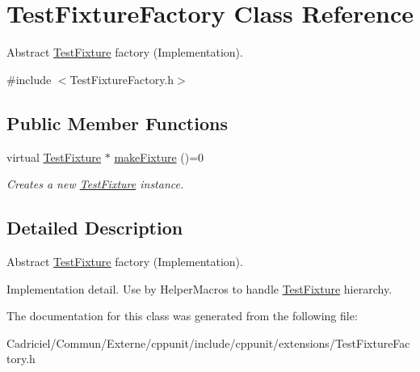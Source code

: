 \hypertarget{class_test_fixture_factory}{\section{Test\-Fixture\-Factory Class Reference}
\label{class_test_fixture_factory}
}


Abstract \hyperlink{class_test_fixture}{Test\-Fixture} factory (Implementation).  




{\ttfamily \#include $<$Test\-Fixture\-Factory.\-h$>$}

\subsection*{Public Member Functions}
\begin{DoxyCompactItemize}
\item 
\hypertarget{class_test_fixture_factory_a50ae33b88d818ef819478e47929a820c}{virtual \hyperlink{class_test_fixture}{Test\-Fixture} $\ast$ \hyperlink{class_test_fixture_factory_a50ae33b88d818ef819478e47929a820c}{make\-Fixture} ()=0}\label{class_test_fixture_factory_a50ae33b88d818ef819478e47929a820c}

\begin{DoxyCompactList}\small\item\em Creates a new \hyperlink{class_test_fixture}{Test\-Fixture} instance. \end{DoxyCompactList}\end{DoxyCompactItemize}


\subsection{Detailed Description}
Abstract \hyperlink{class_test_fixture}{Test\-Fixture} factory (Implementation). 

Implementation detail. Use by Helper\-Macros to handle \hyperlink{class_test_fixture}{Test\-Fixture} hierarchy. 

The documentation for this class was generated from the following file\-:\begin{DoxyCompactItemize}
\item 
Cadriciel/\-Commun/\-Externe/cppunit/include/cppunit/extensions/Test\-Fixture\-Factory.\-h\end{DoxyCompactItemize}
